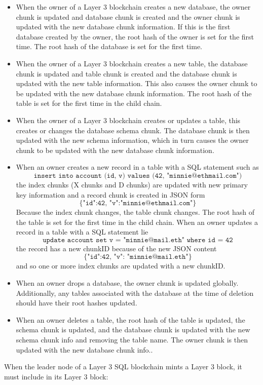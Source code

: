 \documentclass{article}
\newcommand{\sql}[1]{\texttt{#1}}
\newcommand{\json}[1]{\{\texttt{#1}\}}
\begin{document}
\begin{itemize}
\item When the owner of a Layer 3 blockchain creates a new database, the owner chunk is updated and  database chunk is created and the owner chunk is updated with the new database chunk information. If this is the first database created by the owner, the root hash of the owner is set for the first time. The root hash of the database is set for the first time.
\item When the owner of a Layer 3 blockchain creates a new table, the database chunk is updated and table chunk is created and the database chunk is updated with the new table information.  This also causes the owner chunk to be updated with the new database chunk information.  The root hash of the table is set for the first time in the child chain.
\item When the owner of a Layer 3 blockchain creates or updates a table, this creates or changes the database schema chunk.  The database chunk is then updated with the new schema information, which in turn causes the owner chunk to be updated with the new database chunk information.
\item When an owner creates a new record in a table with a SQL statement such as
\[
\sql{insert into account (id, v) values (42, "minnie@ethmail.com")}
\]
the index chunks (X chunks and D chunks) are updated with new primary key information and a record chunk is created in JSON form
\[
\json{{"id":42, "v":"minnie@ethmail.com"}}
\]
Because the index chunk changes, the table chunk changes. The root hash of the table is set for the first time in the child chain.
When an owner updates a record in a table with a SQL statement lie
\[
\sql{update account set v = "minnie@mail.eth" where id = 42}
\]
the record has a new chunkID because of the new JSON content
\[
\json{{"id":42, "v": "minnie@mail.eth"}}
\]
and so one or more index chunks are updated with a new chunkID.
\item When an owner drops a database, the owner chunk is updated globally.  Additionally, any tables associated with the database at the time of deletion should have their root hashes updated.
\item When an owner deletes a table, the root hash of the table is updated, the schema chunk is updated, and the database chunk is updated with the new schema chunk info and removing the table name.  The owner chunk is then updated with the new database chunk info..
\end{itemize}
When the leader node of a Layer 3 SQL blockchain mints a Layer 3 block, it must include in its Layer 3 block:
\end{document}
